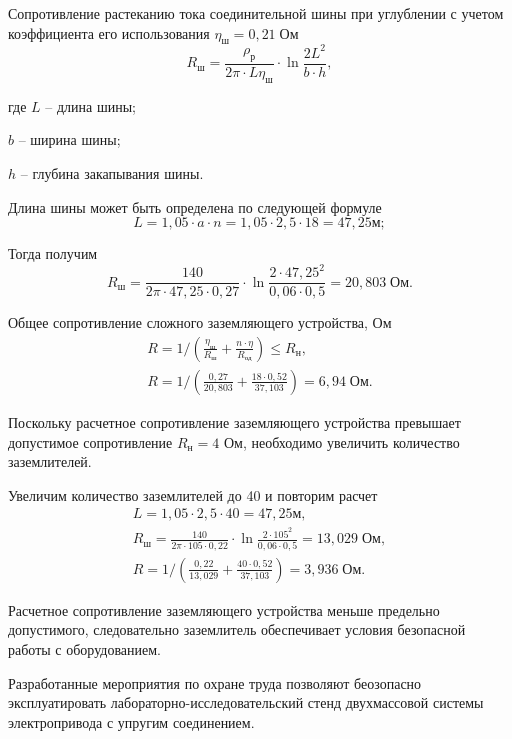         Сопротивление растеканию тока соединительной шины при углублении с
        учетом коэффициента его использования $\eta_\text{ш} = 0,21 \;
        \text{Ом}$
        \begin{equation*}
            R_\text{ш} = \frac{\rho_\text{р}}{2\pi \cdot L \eta_\text{ш}}
                \cdot \ln \frac{2L^2}{b \cdot h},
        \end{equation*}

        где $L$ -- длина шины;\par
        $b$ -- ширина шины;\par
        $h$ -- глубина закапывания шины.

        Длина шины может быть определена по следующей формуле
        \begin{equation*}
            L = 1,05 \cdot a \cdot n = 1,05 \cdot 2,5 \cdot 18
                = 47,25 \text{м};
        \end{equation*}

        Тогда получим
        \begin{equation*}
            R_\text{ш} = \frac{140}{2\pi \cdot 47,25 \cdot 0,27} \cdot
                \ln \frac{2 \cdot 47,25^2}{0,06 \cdot 0,5}
                    = 20,803 \; \text{Ом}.
        \end{equation*}
        
        Общее сопротивление сложного заземляющего устройства, Ом
        \begin{gather*}
            R = 1 / \left( \frac{\eta_\text{ш}}{R_\text{ш}} +
                \frac{n \cdot \eta}{R_\text{од}} \right)
                    \leq R_\text{н},\\
            R = 1 / \left( \frac{0,27}{20,803} +
                \frac{18 \cdot 0,52}{37,103} \right)
                    = 6,94 \; \text{Ом}.
        \end{gather*}

        Поскольку расчетное сопротивление заземляющего устройства превышает
        допустимое сопротивление $R_\text{н} = 4$ %
        Ом, необходимо
        увеличить количество заземлителей.

        Увеличим количество заземлителей до 40 и повторим расчет
        \begin{gather*}
            L = 1,05 \cdot 2,5 \cdot 40
                = 47,25 \text{м},\\
            R_\text{ш} = \frac{140}{2\pi \cdot 105 \cdot 0,22} \cdot
                \ln \frac{2 \cdot 105^2}{0,06 \cdot 0,5}
                    = 13,029 \; \text{Ом},\\
            R = 1 / \left( \frac{0,22}{13,029} +
                \frac{40 \cdot 0,52}{37,103} \right)
                    = 3,936 \; \text{Ом}.
        \end{gather*}

        Расчетное сопротивление заземляющего устройства меньше предельно
        допустимого, следовательно заземлитель обеспечивает условия безопасной
        работы с оборудованием.

        Разработанные мероприятия по охране труда позволяют беозопасно
        эксплуатировать лабораторно-исследовательский стенд двухмассовой
        системы электропривода с упругим соединением.

